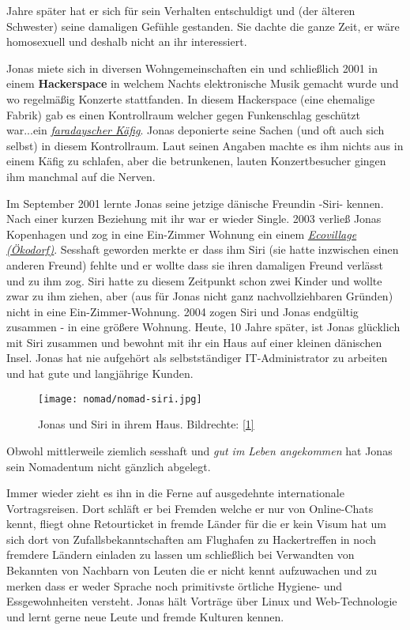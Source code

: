 \documentclass[10pt,a4paper,ngerman,twoside]{article} %
\begin{document}
Jahre später hat er sich für sein Verhalten entschuldigt und (der älteren Schwester) seine damaligen Gefühle gestanden. Sie dachte die ganze Zeit, er wäre homosexuell und deshalb nicht an ihr interessiert. 

Jonas miete sich in diversen Wohngemeinschaften ein und schließlich 2001 in einem \textbf{Hackerspace} in welchem Nachts elektronische Musik gemacht wurde und wo regelmäßig Konzerte stattfanden. In diesem Hackerspace (eine ehemalige Fabrik) gab es einen Kontrollraum welcher gegen Funkenschlag geschützt war...ein \href{http://goo.gl/wfPa4p}{\textit{faradayscher Käfig}}. Jonas deponierte seine Sachen (und oft auch sich selbst) in diesem Kontrollraum. Laut seinen Angaben machte es ihm nichts aus in einem Käfig zu schlafen, aber die betrunkenen, lauten Konzertbesucher gingen ihm manchmal auf die Nerven.

Im September 2001 lernte Jonas seine jetzige dänische Freundin -Siri- kennen. Nach einer kurzen Beziehung mit ihr war er wieder Single. 2003 verließ Jonas Kopenhagen und zog in eine Ein-Zimmer Wohnung ein einem \href{https://en.wikipedia.org/wiki/Ecovillage}{\textit{Ecovillage (Ökodorf)}}. Sesshaft geworden merkte er dass ihm Siri (sie hatte inzwischen einen anderen Freund) fehlte und er wollte dass sie ihren damaligen Freund verlässt und zu ihm zog. Siri hatte zu diesem Zeitpunkt schon zwei Kinder und wollte zwar zu ihm ziehen, aber (aus für Jonas nicht ganz nachvollziehbaren Gründen) nicht in eine Ein-Zimmer-Wohnung. 2004 zogen Siri und Jonas endgültig zusammen - in eine größere Wohnung. Heute, 10 Jahre später, ist Jonas glücklich mit Siri zusammen und bewohnt mit ihr ein Haus auf einer kleinen dänischen Insel. Jonas hat nie aufgehört als selbstständiger IT-Administrator zu arbeiten und hat gute und langjährige Kunden. 


\begin{figure}
\texttt{[image: nomad/nomad-siri.jpg]}
\caption{Jonas und Siri in ihrem Haus. Bildrechte: \href{http://dr.jones.dk}{{[}1{]}}}
\end{figure}

Obwohl mittlerweile ziemlich sesshaft und \emph{gut im Leben angekommen} hat Jonas sein Nomadentum nicht gänzlich abgelegt.

Immer wieder  zieht es ihn in die Ferne auf ausgedehnte internationale Vortragsreisen. Dort schläft er bei Fremden welche er nur von Online-Chats kennt, fliegt ohne Retourticket in fremde Länder für die er kein Visum hat um sich dort von Zufallsbekanntschaften am Flughafen zu Hackertreffen in noch fremdere Ländern einladen zu lassen um schließlich bei Verwandten von Bekannten von Nachbarn von Leuten die er nicht kennt aufzuwachen und zu merken dass er weder Sprache noch primitivste örtliche Hygiene- und Essgewohnheiten versteht. Jonas hält  Vorträge über Linux und Web-Technologie und lernt gerne neue Leute und fremde Kulturen kennen.
\end{document}
